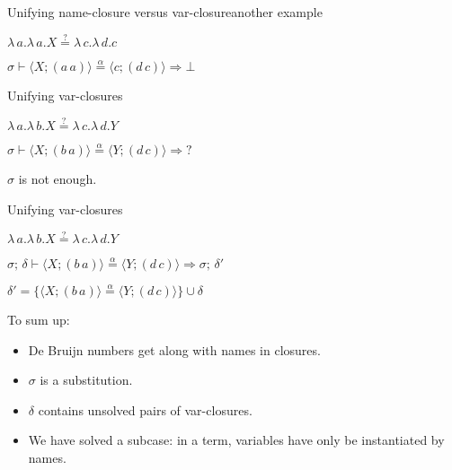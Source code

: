 \documentclass[pdf]{beamer}
\newcommand{\clos}[2] {
\langle #1; #2 \rangle
}
\newcommand{\transition}[4] {
  $#1 \vdash #2 \stackrel{\alpha}{=} #3 \Rightarrow #4$
}
\newcommand{\eqha}[2] {
  #1\stackrel{?}{=}#2
}
\begin{document}
\begin{frame}{Unifying name-closure versus var-closure}{another example}

  {\centering
    $\eqha{\lambda\,a.\lambda\,a.X}{\lambda\,c.\lambda\,d.c}$

    \vspace{1cm}
    \transition
    {\sigma}
    {\clos{X}{(a\,a)}}
    {\clos{c}{(d\,c)}}
    \bot
    \par}
\end{frame}

\begin{frame}{Unifying var-closures}

 {\centering
     $\eqha{\lambda\,a.\lambda\,b.X}{\lambda\,c.\lambda\,d.Y}$

    \vspace{1cm}
   \transition
    {\sigma}
    {\clos{X}{(b\,a)}}
    {\clos{Y}{(d\,c)}}
    {?}
    \par}
   
  \vspace{1cm}
  {\centering
   $\sigma$ is not enough.
 \par}
\end{frame}

\begin{frame}{Unifying var-closures}

 {\centering
    $\eqha{\lambda\,a.\lambda\,b.X}{\lambda\,c.\lambda\,d.Y}$

    \vspace{1cm}
   \transition
    {\sigma;\,\delta}
    {\clos{X}{(b\,a)}}
    {\clos{Y}{(d\,c)}}
    {\sigma;\,\delta'}

    \vspace{1cm}
    $\delta' = \{\clos{X}{(b\,a)} \stackrel{\alpha}{=} \clos{Y}{(d\,c)}\}\cup\delta$
    \par}
\end{frame}

\begin{frame}{To sum up:}
  
  \begin{itemize}
  \item De Bruijn numbers get along with names in closures.
    
  \item $\sigma$ is a substitution.
    
  \item $\delta$ contains unsolved pairs of var-closures.
    
  \item We have solved a subcase: in a term, variables have
    only be instantiated by names.
  \end{itemize}
\end{frame}
\end{document}
